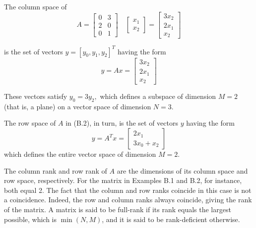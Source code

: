 \documentclass[a4paper, 12pt]{book}
\begin{document}
\begin{greenbox}[Example B.1]
The column space of
\begin{equation}
    A = \begin{bmatrix} 0 & 3 \\ 2 & 0 \\ 0 & 1 \end{bmatrix} \quad 
    \begin{bmatrix} x_1 \\ x_2 \end{bmatrix} 
    = \begin{bmatrix} 3x_2 \\ 2x_1 \\ x_2 \end{bmatrix} \tag{B.2}
\end{equation}

is the set of vectors $y=[y_{0}, y_{1}, y_{2}]^{T}$ having the form
\begin{equation}
    y = Ax = \begin{bmatrix} 3x_{2} \\ 2x_{1} \\ x_{2} \end{bmatrix} \tag{B.3}
\end{equation}

These vectors satisfy $y_{0}=3y_{2},$ which defines a subspace of dimension $M=2$ (that is, a plane) on a vector space of dimension $N=3$.
\end{greenbox}

\begin{greenbox}[Example B.2]
The row space of $A$ in (B.2), in turn, is the set of vectors $y$ having the form
\begin{equation}
    y = A^T x = \begin{bmatrix} 2x_1 \\ 3x_0 + x_2 \end{bmatrix} \tag{B.5}
\end{equation}
which defines the entire vector space of dimension $M=2$.
\end{greenbox}

The column rank and row rank of $A$ are the dimensions of its column space and row space, respectively. For the matrix in Examples B.1 and B.2, for instance, both equal 2. The fact that the column and row ranks coincide in this case is not a coincidence. Indeed, the row and column ranks always coincide, giving the rank of the matrix. A matrix is said to be full-rank if its rank equals the largest possible, which is $\min(N,M)$, and it is said to be rank-deficient otherwise.
\end{document}
